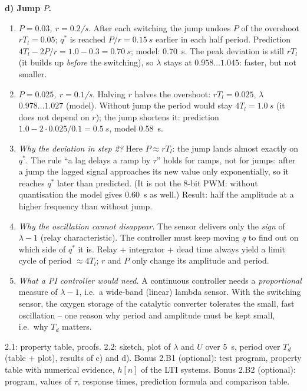 \begin{solution}
\textbf{d) Jump $P$.}
\begin{enumerate}[label=Step \arabic*:,leftmargin=*,itemsep=1pt]
  \item \emph{$P=0.03$, $r=0.2$/s.} After each switching the jump undoes $P$
    of the overshoot $rT_l=0.05$; $q^*$ is reached $P/r=\SI{0.15}{s}$ earlier
    in each half period. Prediction $4T_l-2P/r=1.0-0.3=\SI{0.70}{s}$; model:
    \SI{0.70}{s}. The peak deviation is still $rT_l$ (it builds up
    \emph{before} the switching), so $\lambda$ stays at $0.958\dots1.045$:
    faster, but not smaller.
  \item \emph{$P=0.025$, $r=0.1$/s.} Halving $r$ halves the overshoot:
    $rT_l=0.025$, $\lambda$ $0.978\dots1.027$ (model). Without jump the period
    would stay $4T_l=\SI{1.0}{s}$ (it does not depend on $r$); the jump
    shortens it: prediction $1.0-2\cdot0.025/0.1=\SI{0.5}{s}$, model \SI{0.58}{s}.
  \item \emph{Why the deviation in step 2?} Here $P\approx rT_l$: the jump
    lands almost exactly on $q^*$. The rule ``a lag delays a ramp by $\tau$''
    holds for ramps, not for jumps: after a jump the lagged signal approaches
    its new value only exponentially, so it reaches $q^*$ later than predicted.
    (It is not the 8-bit PWM: without quantisation the model gives
    \SI{0.60}{s} as well.) Result: half the amplitude at a higher frequency
    than without jump.
  \item \emph{Why the oscillation cannot disappear.} The sensor delivers only
    the \emph{sign} of $\lambda-1$ (relay characteristic). The controller must
    keep moving $q$ to find out on which side of $q^*$ it is. Relay +
    integrator + dead time always yield a limit cycle of period
    $\approx4T_l$; $r$ and $P$ only change its amplitude and period.
  \item \emph{What a PI controller would need.} A continuous controller needs a
    \emph{proportional} measure of $\lambda-1$, i.e.\ a wide-band (linear)
    lambda sensor. With the switching sensor, the oxygen storage of the
    catalytic converter tolerates the small, fast oscillation -- one reason
    why period and amplitude must be kept small, i.e.\ why $T_d$ matters.
\end{enumerate}
\end{solution}

\begin{deliverables}
2.1: property table, proofs. 2.2: sketch, plot of
$\lambda$ and $U$ over \SI{5}{s}, period over $T_d$ (table + plot), results of
c) and d). Bonus 2.B1 (optional): test program, property table with
numerical evidence, $h[n]$ of the LTI systems. Bonus 2.B2 (optional): program,
values of $\tau$, response times, prediction formula and comparison table.
\end{deliverables}

